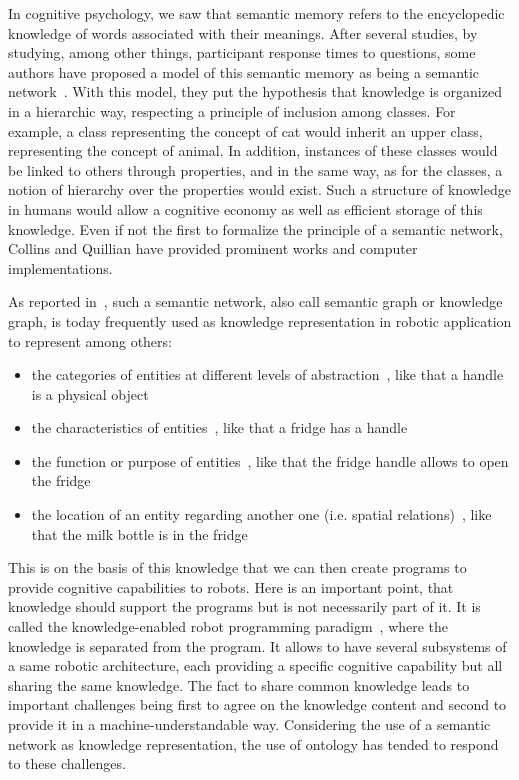 In cognitive psychology, we saw that semantic memory refers to the encyclopedic knowledge of words associated with their meanings. After several studies, by studying, among other things, participant response times to questions, some authors have proposed a model of this semantic memory as being a semantic network~\cite{collins_1969_retrieval, collins_1970_does}. With this model, they put the hypothesis that knowledge is organized in a hierarchic way, respecting a principle of inclusion among classes. For example, a class representing the concept of cat would inherit an upper class, representing the concept of animal. In addition, instances of these classes would be linked to others through properties, and in the same way, as for the classes, a notion of hierarchy over the properties would exist. Such a structure of knowledge in humans would allow a cognitive economy as well as efficient storage of this knowledge. Even if not the first to formalize the principle of a semantic network, Collins and Quillian have provided prominent works and computer implementations.

As reported in~\cite{prasad_2020_knowledge}, such a semantic network, also call semantic graph or knowledge graph, is today frequently used as knowledge representation in robotic application to represent among others:

\begin{itemize}
  \item the categories of entities at different levels of abstraction~\cite{balint_2018_variations}, like that a handle is a physical object
  \item the characteristics of entities~\cite{tenorth_2017_representations}, like that a fridge has a handle
  \item the function or purpose of entities~\cite{paulius_2019_functional}, like that the fridge handle allows to open the fridge
  \item the location of an entity regarding another one (i.e. spatial relations)~\cite{singh_2020_fuzzy}, like that the milk bottle is in the fridge
\end{itemize}

This is on the basis of this knowledge that we can then create programs to provide cognitive capabilities to robots. Here is an important point, that knowledge should support the programs but is not necessarily part of it. It is called the knowledge-enabled robot programming paradigm~\cite{beetz_2012_cognition}, where the knowledge is separated from the program. It allows to have several subsystems of a same robotic architecture, each providing a specific cognitive capability but all sharing the same knowledge. The fact to share common knowledge leads to important challenges being first to agree on the knowledge content and second to provide it in a machine-understandable way. Considering the use of a semantic network as knowledge representation, the use of ontology has tended to respond to these challenges.


